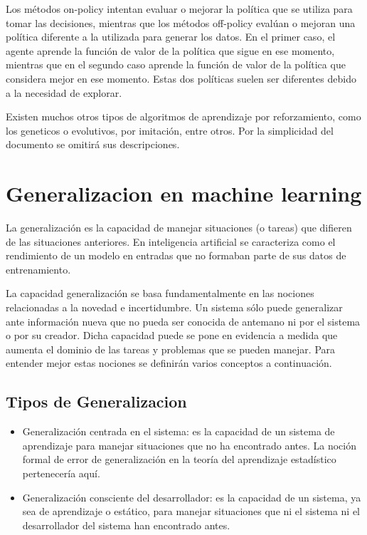 Los métodos on-policy intentan evaluar o mejorar la política que se utiliza para tomar las decisiones, mientras que los métodos off-policy evalúan o mejoran una política diferente a la utilizada para generar los datos. En el primer caso, el agente aprende la función de valor de la política que sigue en ese momento, mientras que en el segundo caso aprende la función de valor de la política que considera mejor en ese momento. Estas dos políticas suelen ser diferentes debido a la necesidad de explorar.

Existen muchos otros tipos de algoritmos de aprendizaje por reforzamiento, como los geneticos o evolutivos, por imitación, entre otros. Por la simplicidad del documento se omitirá sus descripciones.

\section{Generalizacion en machine learning}\label{section:state-of-the-art:generalization-on-machine-learning}

La generalización es la capacidad de manejar situaciones (o tareas) que difieren de las situaciones anteriores. En inteligencia artificial se caracteriza como el rendimiento de un modelo en entradas que no formaban parte de sus datos de entrenamiento.

La capacidad generalización se basa fundamentalmente en las nociones relacionadas a la novedad e incertidumbre. Un sistema sólo puede generalizar ante información nueva que no pueda ser conocida de antemano ni por el sistema o por su creador. Dicha capacidad puede se pone en evidencia a medida que aumenta el dominio de las tareas y problemas que se pueden manejar. Para entender mejor estas nociones se definirán varios conceptos a continuación.

\subsection*{Tipos de Generalizacion}

\begin{itemize}
\item Generalización centrada en el sistema: es la capacidad de un sistema de aprendizaje para manejar situaciones que no ha encontrado antes. La noción formal de error de generalización en la teoría del aprendizaje estadístico pertenecería aquí.

\item Generalización consciente del desarrollador: es la capacidad de un sistema, ya sea de aprendizaje o estático, para manejar situaciones que ni el sistema ni el desarrollador del sistema han encontrado antes.
\end{itemize}
